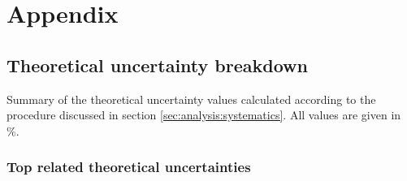 \chapter{Appendix}
\label{app:ttzdm}
\section{Theoretical uncertainty breakdown}
\label{app:theoUnc}
Summary of the theoretical uncertainty values calculated according to the procedure discussed in section \ref{sec:analysis:systematics}.  All values are given in \%.

\subsection*{Top related theoretical uncertainties}

